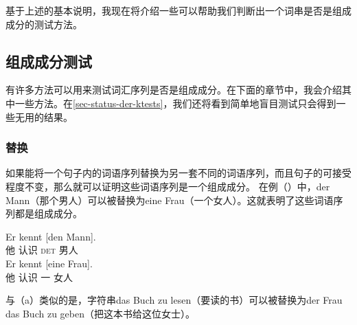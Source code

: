 基于上述的基本说明，我现在将介绍一些可以帮助我们判断出一个词串是否是组成成分的测试方法。


\subsection{组成成分测试}
有许多方法可以用来测试词汇序列是否是组成成分。在下面的章节中，我会介绍其中一些方法。在\ref{sec-status-der-ktests}，我们还将看到简单地盲目测试只会得到一些无用的结果。

\subsubsection{替换}
如果能将一个句子内的词语序列替换为另一套不同的词语序列，而且句子的可接受程度不变，那么就可以证明这些词语序列是一个组成成分。
在例（）中，der Mann（那个男人）可以被替换为eine Frau（一个女人）。这就表明了这些词语序列都是组成成分。

\eal
\ex 
\gll Er kennt [den Mann].\\
     他 认识 \spacebr{}\textsc{det} 男人\\
\ex 
\gll Er kennt [eine Frau].\\
     他 认识 \spacebr{}一 女人\\
\zl

\noindent
与（a）类似的是，字符串das Buch zu lesen（要读的书）可以被替换为der Frau das Buch zu geben（把这本书给这位女士）。

